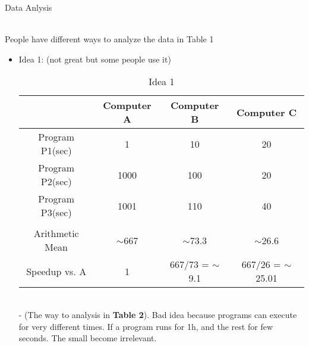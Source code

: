 \documentclass[12pt]{article}
\begin{document}
\begin{itemize}
\begin{table}[]
                            \caption{Data Anlysis}
                        \end{table}
                        \\People have different ways to analyze the data in Table 1
                            \begin{itemize}
                                \item {Idea 1: (not great but some people use it)}
                                    \begin{table}[]
                                        \centering
                                        \begin{tabular}{cccc}
\hline
\multicolumn{1}{|c|}{}                & \multicolumn{1}{c|}{Computer A} & \multicolumn{1}{c|}{Computer B}         & \multicolumn{1}{c|}{Computer C}           \\ \hline
\multicolumn{1}{|c|}{Program P1(sec)} & \multicolumn{1}{c|}{1}          & \multicolumn{1}{c|}{10}                 & \multicolumn{1}{c|}{20}                   \\ \hline
\multicolumn{1}{|c|}{Program P2(sec)} & \multicolumn{1}{c|}{1000}       & \multicolumn{1}{c|}{100}                & \multicolumn{1}{c|}{20}                   \\ \hline
\multicolumn{1}{|c|}{Program P3(sec)} & \multicolumn{1}{c|}{1001}       & \multicolumn{1}{c|}{110}                & \multicolumn{1}{c|}{40}                   \\ \hline
                                      &                                 &                                         &                                           \\ \hline
\multicolumn{1}{|c|}{Arithmetic Mean} & \multicolumn{1}{c|}{$\sim$667}  & \multicolumn{1}{c|}{$\sim$73.3}         & \multicolumn{1}{c|}{$\sim$26.6}           \\ \hline
\multicolumn{1}{|c|}{Speedup vs. A}   & \multicolumn{1}{c|}{1}          & \multicolumn{1}{c|}{667/73 = $\sim$9.1} & \multicolumn{1}{c|}{667/26 = $\sim$25.01} \\ \hline
\end{tabular}
                                        \caption{Idea 1}
                                        \label{tab:my_label}
                                    \end{table}
                                    \\- (The way to analysis in \textbf{Table 2}). Bad idea because programs can execute for very different times. If a program runs for 1h, and the rest for few seconds. The small become irrelevant.

\end{itemize}
\end{itemize}
\end{document}
